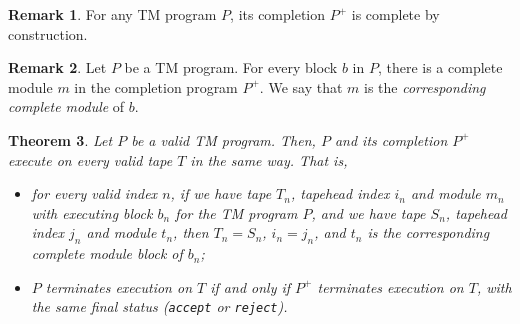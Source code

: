 \documentclass{article}
\newtheorem{theorem}{Theorem}[section]
\theoremstyle{definition}
\newtheorem{remark}[theorem]{Remark}
\begin{document}
    \begin{remark}
        For any TM program $P$, its completion $P^+$ is complete by construction.
    \end{remark}

    \begin{remark}
        Let $P$ be a TM program. For every block $b$ in $P$, there is a complete module $m$ in the completion program $P^+$. We say that $m$ is the \emph{corresponding complete module} of $b$.
    \end{remark}

    \begin{theorem}
        Let $P$ be a valid TM program. Then, $P$ and its completion $P^+$ execute on every valid tape $T$ in the same way. That is,
        \begin{itemize}
            \item for every valid index $n$, if we have tape $T_n$, tapehead index $i_n$ and module $m_n$ with executing block $b_n$ for the TM program $P$, and we have tape $S_n$, tapehead index $j_n$ and module $t_n$, then $T_n = S_n$, $i_n = j_n$, and $t_n$ is the corresponding complete module block of $b_n$;
            \item $P$ terminates execution on $T$ if and only if $P^+$ terminates execution on $T$, with the same final status (\texttt{accept} or \texttt{reject}).
        \end{itemize}
    \end{theorem}
\end{document}
